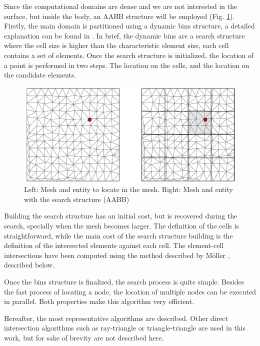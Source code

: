 Since the computational domains are dense and we are not interested in the surface, but inside the body, an AABB structure will be employed (Fig. \ref{bins_search}).
Firstly, the main domain is partitioned using a dynamic bins structure, a detailed explanation can be found in \cite{samet1984}. In brief, the dynamic bins are a search structure where the cell size is higher than the characteristic element size, each cell contains a set of elements. Once the search structure is initialized, the location of a point is performed in two steps. The location on the cells, and the location on the candidate elements.

\begin{figure}[htb]
    \centering
    \includegraphics[width=.9\textwidth]{img/search/bins_search.pdf}
    \caption{Left: Mesh and entity to locate in the mesh. Right: Mesh and entity with the search structure (AABB)}
    \label{bins_search}
\end{figure}

Building the search structure has an initial cost, but is recovered during the search, specially when the mesh becomes larger. The definition of the cells is straightforward, while the main cost of the search structure building is the definition of the intersected elements against each cell. The element-cell intersections have been computed using the method described by Möller \cite{moller2004}, described below.

Once the bins structure is finalized, the search process is quite simple. Besides the fast process of locating a node, the location of multiple nodes can be executed in parallel. Both properties make this algorithm very efficient.

Hereafter, the most representative algorithms are described. Other direct intersection algorithms such as ray-triangle \cite{moller1997, jimenez2014} or triangle-triangle \cite{moller1997tritri} are used in this work, but for sake of brevity are not described here.




